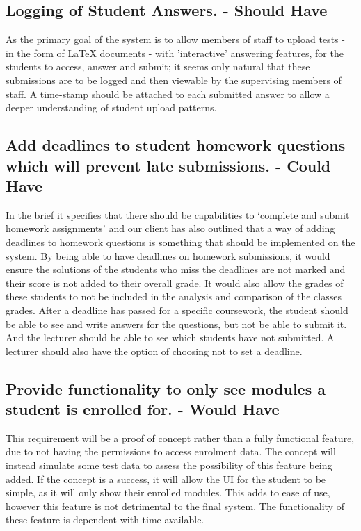 \documentclass[12pt]{article}
\begin{document}
	\subsection{Logging of Student Answers. - Should Have}
	As the primary goal of the system is to allow members of staff to upload tests - in the form of LaTeX documents - with 'interactive' answering features, for the students to access, answer and submit; it seems only natural that these submissions are to be logged and then viewable by the supervising members of staff. A time-stamp should be attached to each submitted answer to allow a deeper understanding of student upload patterns.
	
	\subsection{Add deadlines to student homework questions which will prevent late submissions. - Could Have}
	In the brief it specifies that there should be capabilities to ‘complete and submit homework assignments’ and our client has also outlined that a way of adding deadlines to homework questions is something that should be implemented on the system.
By being able to have deadlines on homework submissions, it would ensure the solutions of the students who miss the deadlines are not marked and their score is not added to their overall grade. It would also allow the grades of these students to not be included in the analysis and comparison of the classes grades.
After a deadline has passed for a specific coursework, the student should be able to see and write answers for the questions, but not be able to submit it.  And the lecturer should be able to see which students have not submitted.
A lecturer should also have the option of choosing not to set a deadline.

	\subsection{Provide functionality to only see modules a student is enrolled for. - Would Have}
	This requirement will be a proof of concept rather than a fully functional feature, due to not having the permissions to access enrolment data. The concept will instead simulate some test data to assess the possibility of this feature being added. If the concept is a success, it will allow the UI for the student to be simple, as it will only show their enrolled modules. This adds to ease of use, however this feature is not detrimental to the final system. The functionality of these feature is dependent with time available.
	
\end{document}
